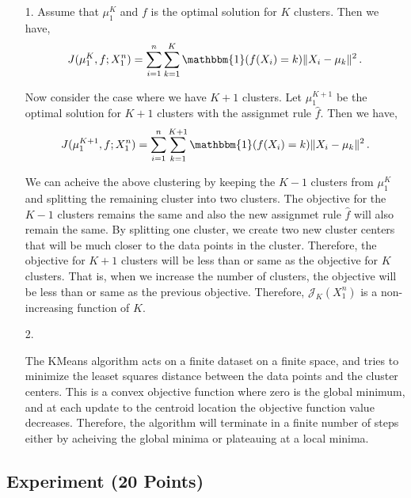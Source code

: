 \documentclass[a4paper]{article}
\newcounter{thm}
\newcommand{\Jcal}{\mathcal{J}}
\newcommand{\indfone}{\mathbbm{1}}
\theoremstyle{definition}
\newenvironment{soln}{
  \leavevmode\color{blue}\ignorespaces
}{}
\begin{document}
\begin{soln}
  \begin{itemize}
    \item [1.]
      Assume that $\mu_1^K$ and $f$ is the optimal solution for $K$ clusters. Then we have,
      \begin{align*}
        J(\mu_1^K, f; X_1^n) = \sum_{i=1}^n \sum_{k=1}^K \indfone(f(X_i) = k) \|X_i - \mu_k\|^2\,.
      \end{align*}

      Now consider the case where we have $K+1$ clusters. Let $\mu_1^{K+1}$ be the optimal solution for $K+1$ clusters with the assignmet rule $\hat{f}$. Then we have,
      \begin{align*}
        J(\mu_1^{K+1}, f; X_1^n) = \sum_{i=1}^n \sum_{k=1}^{K+1} \indfone(f(X_i) = k) \|X_i - \mu_k\|^2\,.
      \end{align*}

      We can acheive the above clustering by keeping the $K-1$ clusters from $\mu_1^K$ and splitting the remaining cluster into two clusters. The objective for the $K-1$ clusters remains the same and also the new assignmet rule $\hat{f}$ will also remain the same. By splitting one cluster, we create two new cluster centers that will be much closer to the data points in the cluster. Therefore, the objective for $K+1$ clusters will be less than or same as the objective for $K$ clusters. That is, when we increase the number of clusters, the objective will be less than or same as the previous objective. Therefore, $\Jcal_{K}(X_1^n)$ is a non-increasing function of $K$.
    \item [2.]
    
      The KMeans algorithm acts on a finite dataset on a finite space, and tries to minimize the leaset squares distance between the data points and the cluster centers. This is a convex objective function where zero is the global minimum, and at each update to the centroid location the objective function value decreases. Therefore, the algorithm will terminate in a finite number of steps either by acheiving the global minima or plateauing at a local minima.
  \end{itemize}
\end{soln}

\subsection{Experiment (20 Points)}
\end{document}
